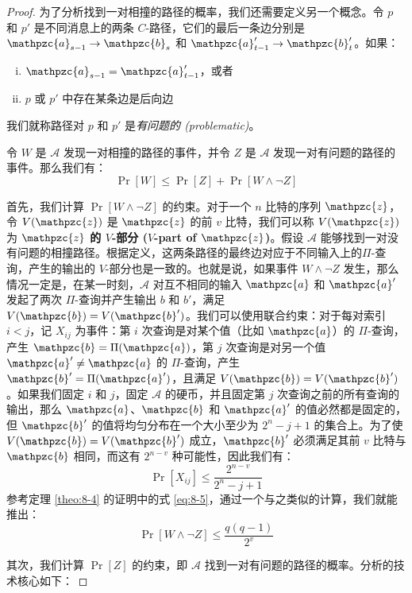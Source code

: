 \begin{proof}
为了分析找到一对相撞的路径的概率，我们还需要定义另一个概念。令 $p$ 和 $p'$ 是不同消息上的两条 $C$-路径，它们的最后一条边分别是 $\mathpzc{a}_{s-1}\to\mathpzc{b}_s$ 和 $\mathpzc{a}_{t-1}'\to\mathpzc{b}_t'$。如果：
\begin{enumerate}[(i)]
	\item $\mathpzc{a}_{s-1} = \mathpzc{a}_{t-1}'$，或者
	\item $p$ 或 $p'$ 中存在某条边是后向边
\end{enumerate}
我们就称路径对 $p$ 和 $p'$ 是\emph{有问题的 (problematic)}。

令 $W$ 是 $\mathcal{A}$ 发现一对相撞的路径的事件，并令 $Z$ 是 $\mathcal{A}$ 发现一对有问题的路径的事件。那么我们有：
\begin{equation}\label{eq:8-13}
\Pr[W]\leq\Pr[Z]+\Pr[W\land\lnot Z]
\end{equation}

首先，我们计算 $\Pr[W\land\lnot Z]$ 的约束。对于一个 $n$ 比特的序列 $\mathpzc{z}$，令 $V(\mathpzc{z})$ 是 $\mathpzc{z}$ 的前 $v$ 比特，我们可以称 $V(\mathpzc{z})$ 为 \textbf{$\mathpzc{z}$ 的 $V$-部分 ($V$-part of $\mathpzc{z}$)}。假设 $\mathcal{A}$ 能够找到一对没有问题的相撞路径。根据定义，这两条路径的最终边对应于不同输入上的$\Pi$-查询，产生的输出的 $V$-部分也是一致的。也就是说，如果事件 $W\land\lnot Z$ 发生，那么情况一定是，在某一时刻，$\mathcal{A}$ 对互不相同的输入 $\mathpzc{a}$ 和 $\mathpzc{a}'$ 发起了两次 $\Pi$-查询并产生输出 $b$ 和 $b'$，满足 $V(\mathpzc{b})=V(\mathpzc{b}')$。我们可以使用联合约束：对于每对索引 $i<j$，记 $X_{ij}$ 为事件：第 $i$ 次查询是对某个值（比如 $\mathpzc{a}$）的 $\Pi$-查询，产生 $\mathpzc{b}=\Pi(\mathpzc{a})$，第 $j$ 次查询是对另一个值 $\mathpzc{a}'\neq\mathpzc{a}$ 的 $\Pi$-查询，产生 $\mathpzc{b}'=\Pi(\mathpzc{a}')$，且满足 $V(\mathpzc{b})=V(\mathpzc{b}')$。如果我们固定 $i$ 和 $j$，固定 $\mathcal{A}$ 的硬币，并且固定第 $j$ 次查询之前的所有查询的输出，那么 $\mathpzc{a}$、$\mathpzc{b}$ 和 $\mathpzc{a}'$ 的值必然都是固定的，但 $\mathpzc{b}'$ 的值将均匀分布在一个大小至少为 $2^n-j+1$ 的集合上。为了使 $V(\mathpzc{b})=V(\mathpzc{b}')$ 成立，$\mathpzc{b}'$ 必须满足其前 $v$ 比特与 $\mathpzc{b}$ 相同，而这有 $2^{n-v}$ 种可能性，因此我们有：
\[
\Pr[X_{ij}]\leq\frac{2^{n-v}}{2^n-j+1}
\]
参考定理 \ref{theo:8-4} 的证明中的式 \ref{eq:8-5}，通过一个与之类似的计算，我们就能推出：
\begin{equation}\label{eq:8-14}
\Pr[W\land\lnot Z]\leq
\frac{q(q-1)}{2^v}
\end{equation}
  
其次，我们计算 $\Pr[Z]$ 的约束，即 $\mathcal{A}$ 找到一对有问题的路径的概率。分析的技术核心如下：


\end{proof}
